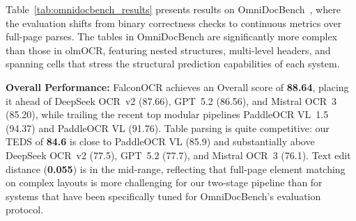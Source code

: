 \begin{table}
    \centering
    \caption{\textbf{OmniDocBench Results:} Performance comparison on full-page document parsing. Overall$\uparrow$ aggregates the three sub-metrics. Edit$\downarrow$ measures text edit distance (lower is better). CDM$\uparrow$ evaluates formula recognition accuracy. TEDS$\uparrow$ measures table structure similarity.\vspace{-0.2cm}}
    \label{tab:omnidocbench_results}
    \setlength{\tabcolsep}{6pt}
\end{table}
Table~\ref{tab:omnidocbench_results} presents results on OmniDocBench~\citep{ouyang2025omnidocbench}, where the evaluation shifts from binary correctness checks to continuous metrics over full-page parses. The tables in OmniDocBench are significantly more complex than those in olmOCR, featuring nested structures, multi-level headers, and spanning cells that stress the structural prediction capabilities of each system. 

\noindent \textbf{Overall Performance:} FalconOCR achieves an Overall score of \textbf{88.64}, placing it ahead of DeepSeek OCR~v2 (87.66), GPT~5.2 (86.56), and Mistral OCR~3 (85.20), while trailing the recent top modular pipelines PaddleOCR VL~1.5 (94.37) and PaddleOCR VL (91.76). Table parsing is quite competitive: our TEDS of \textbf{84.6} is close to PaddleOCR VL (85.9) and substantially above DeepSeek OCR~v2 (77.5), GPT~5.2 (77.7), and Mistral OCR~3 (76.1). Text edit distance (\textbf{0.055}) is in the mid-range, reflecting that full-page element matching on complex layouts is more challenging for our two-stage pipeline than for systems that have been specifically tuned for OmniDocBench's evaluation protocol.


